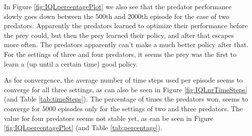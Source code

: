  In Figure \ref{fig:IQLpercentagePlot} we also see that the predator performance slowly goes down between the 500th and 2000th episode for the case of two predators. Apparently the predators learned to optimize their performance before the prey could, but then the prey learned their policy, and after that escapes more often. The predators apparently can't make a much better policy after that. For the settings of three and four predators, it seems the prey was the first to learn a (up until a certain time) good policy.
 
As for convergence, the average number of time steps used per episode seems to converge for all three settings, as can also be seen in Figure \ref{fig:IQLnrTimeSteps} (and Table \ref{tab:timeSteps}). The percentage of times the predators won, seems to converge for $5000$ episodes only for the settings of two and three predators. The value for four predators seems not stable yet, as can be seen in Figure \ref{fig:IQLpercentagePlot} (and Table \ref{tab:percentage}).




